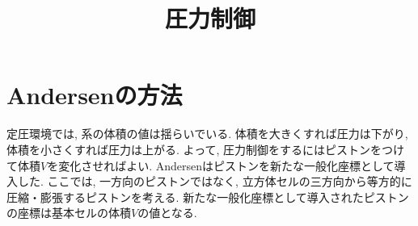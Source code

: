 





\title{圧力制御}
\maketitle

\section{Andersenの方法}
定圧環境では, 系の体積の値は揺らいでいる. 
体積を大きくすれば圧力は下がり, 体積を小さくすれば圧力は上がる. 
よって, 圧力制御をするにはピストンをつけて体積$V$を変化させればよい. 
Andersenはピストンを新たな一般化座標として導入した\cite{1980Andersen}. 
ここでは, 一方向のピストンではなく, 立方体セルの三方向から等方的に圧縮・膨張するピストンを考える. 
新たな一般化座標として導入されたピストンの座標は基本セルの体積$V$の値となる.

